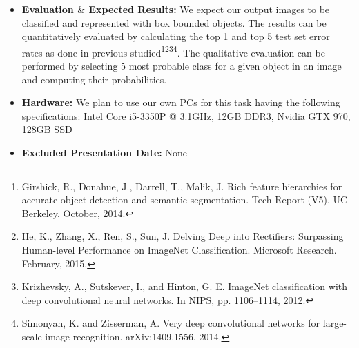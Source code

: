 \documentclass[8pt,a4]{article}
\begin{document}
\begin{itemize}
	Results and Evaluation: We expect our output images to be classified and represented with box bounded objects. The results can be quantitatively evaluated by calculating the top 1 and top 5 test set error rates as done in previous studied\footnote{Girshick, R., Donahue, J., Darrell, T., Malik, J. Rich feature hierarchies for accurate object detection and semantic segmentation. Tech Report (V5). UC Berkeley. October, 2014.}\footnote{He, K., Zhang, X., Ren, S., Sun, J. Delving Deep into Rectifiers: Surpassing Human-level Performance on ImageNet Classification. Microsoft Research. February, 2015.}\footnote{Krizhevsky, A., Sutskever, I., and Hinton, G. E. ImageNet classification with deep convolutional neural networks. In NIPS, pp. 1106–1114, 2012.}5]. The qualitative evaluation can be performed by selecting 5 most probable class for a given object in an image and computing their probabilities. 
	
	
	\item \textbf{Evaluation $\mathbf{\&}$ Expected  Results:} We expect our output images to be classified and represented with box bounded objects. The results can be quantitatively evaluated by calculating the top 1 and top 5 test set error rates as done in previous studied\footnote{Girshick, R., Donahue, J., Darrell, T., Malik, J. Rich feature hierarchies for accurate object detection and semantic segmentation. Tech Report (V5). UC Berkeley. October, 2014.
	}\footnote{He, K., Zhang, X., Ren, S., Sun, J. Delving Deep into Rectifiers: Surpassing Human-level Performance on ImageNet Classification. Microsoft Research. February, 2015.
}\footnote{Krizhevsky, A., Sutskever, I., and Hinton, G. E. ImageNet classification with deep convolutional neural networks. In NIPS, pp. 1106–1114, 2012.
}\footnote{
Simonyan, K. and Zisserman, A. Very deep convolutional networks for large-scale image recognition. arXiv:1409.1556, 2014.
}. The qualitative evaluation can be performed by selecting 5 most probable class for a given object in an image and computing their probabilities. 
	
	\item \textbf{Hardware:} We plan to use our own PCs for this task having the following specifications:
	Intel Core i5-3350P @ 3.1GHz, 12GB DDR3, Nvidia GTX 970, 128GB SSD
	
	\item \textbf{Excluded Presentation Date:} None
\end{itemize}
\end{document}
